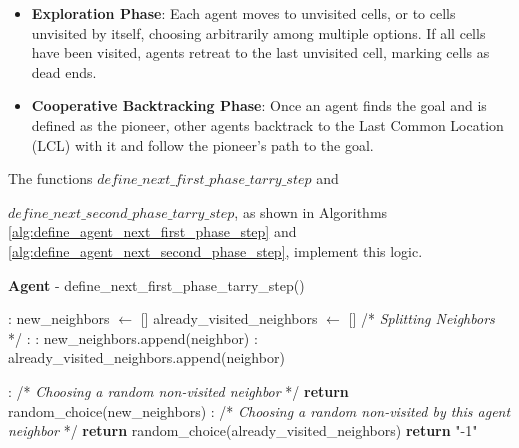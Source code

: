 \begin{itemize}
    \item \textbf{Exploration Phase}: Each agent moves to unvisited cells, or to cells unvisited by itself, choosing arbitrarily among multiple options. If all cells have been visited, agents retreat to the last unvisited cell, marking cells as dead ends.
    \item \textbf{Cooperative Backtracking Phase}: Once an agent finds the goal and is defined as the pioneer, other agents backtrack to the Last Common Location (LCL) with it and follow the pioneer's path to the goal.
\end{itemize}

The functions $define\_next\_first\_phase\_tarry\_step$ and 

$define\_next\_second\_phase\_tarry\_step$, as shown in Algorithms \ref{alg:define_agent_next_first_phase_step} and \ref{alg:define_agent_next_second_phase_step}, implement this logic.

\begin{algorithm}
\caption{\textbf{Agent} - define\_next\_first\_phase\_tarry\_step()}
\label{alg:define_agent_next_first_phase_step}
\begin{algorithmic}
    :
    \State new\_neighbors $\gets$ [] 
    \State already\_visited\_neighbors $\gets$ []
    \State /* \textit{Splitting Neighbors } */
    :
        :
            \State new\_neighbors.append(neighbor)
        :
            \State already\_visited\_neighbors.append(neighbor)
        \EndIf
    \EndFor


    :
        \State /* \textit{Choosing a random non-visited neighbor } */
        \State \textbf{return} random\_choice(new\_neighbors)
    :
        \State /* \textit{Choosing a random non-visited by this agent neighbor } */
        \State \textbf{return} random\_choice(already\_visited\_neighbors)
    \EndIf
    \State \textbf{return} "-1" 
    \EndProcedure
\end{algorithmic}
\end{algorithm}


